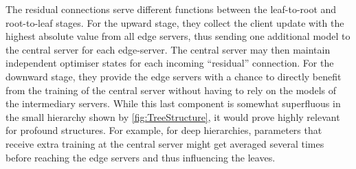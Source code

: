 The residual connections serve different functions between the leaf-to-root and root-to-leaf stages. For the upward stage, they collect the client update with the highest absolute value from all edge servers, thus sending one additional model to the central server for each edge-server. The central server may then maintain independent optimiser states for each incoming ``residual'' connection. For the downward stage, they provide the edge servers with a chance to directly benefit from the training of the central server without having to rely on the models of the intermediary servers. While this last component is somewhat superfluous in the small hierarchy shown by \cref{fig:TreeStructure}, it would prove highly relevant for profound structures. For example, for deep hierarchies, parameters that receive extra training at the central server might get averaged several times before reaching the edge servers and thus influencing the leaves.



